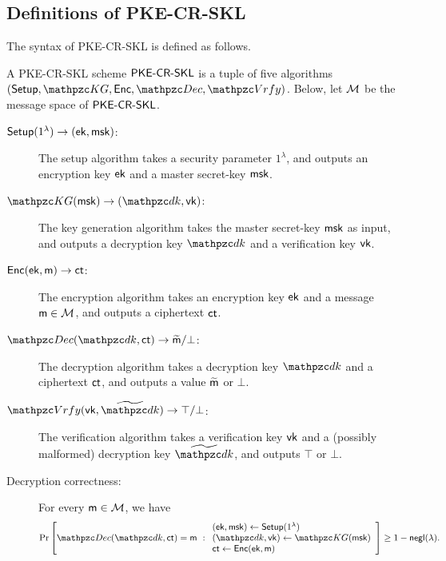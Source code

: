 \subsection{Definitions of PKE-CR-SKL}
The syntax of PKE-CR-SKL is defined as follows. 
\begin{definition}
    A PKE-CR-SKL scheme $\mathsf{PKE}\textrm{-}\mathsf{CR}\textrm{-}\mathsf{SKL}$ is a tuple of five algorithms
    $(\Setup,\qKG, \Enc, \allowbreak \qDec,\qVrfy)$. 
Below, let $\mathcal{M}$  be the message space of $\mathsf{PKE}\textrm{-}\mathsf{CR}\textrm{-}\mathsf{SKL}$. 
\begin{description}
\item[$\mathsf{Setup}(1^\lambda)\rightarrow(\mathsf{ek},\mathsf{msk})$:] The setup algorithm takes a
    security parameter $1^\lambda$, and outputs an encryption key
    $\mathsf{ek}$ and a master secret-key $\mathsf{msk}$.

\item[$\qKG(\msk)\ra(\qdk,\vk)$:] The key generation algorithm takes
the master secret-key $\mathsf{msk}$ as input, and outputs a decryption key
$\qdk$ and a verification key $\mathsf{vk}$.

\item[$\mathsf{Enc}(\mathsf{ek},\mathsf{m})\rightarrow\mathsf{ct}$:] The encryption algorithm takes an
    encryption key $\mathsf{ek}$ and a message $\mathsf{m} \in \mathcal{M}$, and outputs a ciphertext $\mathsf{ct}$.

\item[$\qDec(\qdk,\ct)\ra\widetilde{\msg}/\bot$:] The decryption
    algorithm takes a decryption key $\qdk$ and a ciphertext $\mathsf{ct}$,
    and outputs a value $\widetilde{\mathsf{m}}$ or $\bot$.


\item[$\qVrfy(\vk,\widetilde{\qdk})\ra\top/\bot$:] The verification algorithm takes a verification key $\mathsf{vk}$ and a (possibly malformed) decryption key $\widetilde{\qdk}$, and outputs $\top$ or $\bot$.


\item[Decryption correctness:]For every $\mathsf{m} \in \mathcal{M}$, we have
\begin{align}
\Pr\left[
\qDec(\qdk, \ct) \allowbreak = \msg
\ :
\begin{array}{ll}
(\ek,\msk)\gets\Setup(1^\secp)\\
(\qdk,\vk)\gets\qKG(\msk)\\
\ct\gets\Enc(\ek,\msg)
\end{array}
\right] 
\ge 1-\negl(\secp).
\end{align}


\end{description}
\end{definition}
